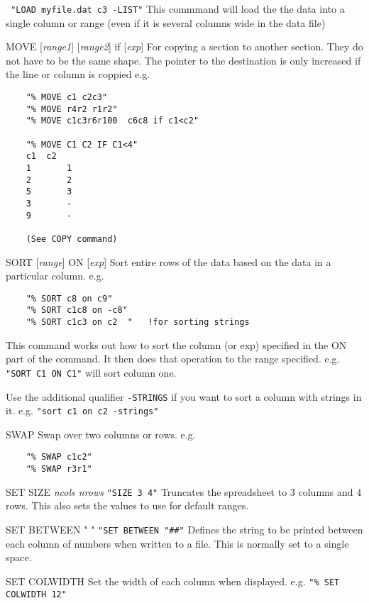 \begin{commanddescription}
\verb# "LOAD myfile.dat c3 -LIST"#
This commmand will load the the data into a single column or range
(even if it is several columns wide in the data file)

\item[{\sf MOVE [{\it range1}] [{\it range2}] if [{\it exp}]}]
For copying a section to another section. They do not have to be the 
same shape. The pointer to the destination is only increased if 
the line or column is coppied e.g.
\begin{verbatim}
	"% MOVE c1 c2c3"
	"% MOVE r4r2 r1r2"
	"% MOVE c1c3r6r100  c6c8 if c1<c2"

	"% MOVE C1 C2 IF C1<4"
	c1 	c2
	1       1
	2       2
	5       3
	3       -
	9       -

	(See COPY command)
\end{verbatim}

\item[{\sf SORT [{\it range}] ON [{\it exp}]}]
Sort entire rows of the data based on the data in a particular column. e.g.
\begin{verbatim}
	"% SORT c8 on c9"
	"% SORT c1c8 on -c8"
	"% SORT c1c3 on c2  " 	!for sorting strings

\end{verbatim}
This command works out how to sort the column (or exp) specified
in the {\sf ON} part of the command.  It then does that operation to
the range specified. e.g. \verb#"SORT C1 ON C1"#  will sort column one.

Use the additional qualifier \verb#-STRINGS# if you want to sort a
column with strings in it. e.g. \verb#"sort c1 on c2 -strings"#

\item[{\sf SWAP}]
Swap over two columns or rows. e.g.
\begin{verbatim}
 	"% SWAP c1c2"
	"% SWAP r3r1"
\end{verbatim}

\item[{\sf SET SIZE {\it ncols nrows}}]
\verb#"SIZE 3 4"# Truncates the spreadsheet to 3 columns and 4 rows.  This
also sets the values to use for default ranges.

\item[{\sf SET BETWEEN " "}]
\verb$"SET BETWEEN "##"$ Defines the string to be printed 
between each column of numbers when written to a file. 
This is normally set to a single space.

\item[{\sf SET COLWIDTH}]
Set the width of each column when displayed.
e.g. \verb#"% SET COLWIDTH 12"#


\end{commanddescription}
